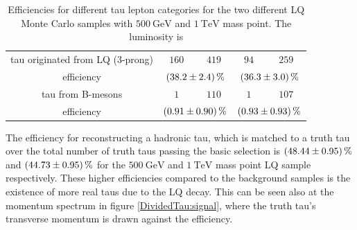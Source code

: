 \begin{table}
\begin{tabular*}{\linewidth}{@{\extracolsep{\fill}}ccccc}
		\hline
                tau originated from LQ (3-prong)& $160$        & $419$         & $94$          & $259$
		\\
		efficiency                  & \multicolumn{2}{c}{$\SI{38.2\pm 2.4}{\percent}$}   & \multicolumn{2}{c}{$\SI{36.3\pm 3.0}{\percent}$}
		\\
		\hline
		tau from B-mesons           & $1$            & $110$      & $1$            & $107$ 
		\\
		efficiency                  & \multicolumn{2}{c}{$\SI{0.91\pm 0.90}{\percent}$}   & \multicolumn{2}{c}{$\SI{0.93\pm 0.93}{\percent}$}
		\\
		\hline
		\hline
		\end{tabular*}
		\caption[Efficiencies for the two LQ samples with $\SI{500}{\giga\electronvolt}$ and $\SI{1}{\tera\electronvolt}$ mass point.]{Efficiencies for different tau lepton categories for the two different LQ Monte Carlo samples with $\SI{500}{\giga\electronvolt}$ and $\SI{1}{\tera\electronvolt}$ mass point. The luminosity is}
		\label{LQEffTable}
                \renewcommand{\arraystretch}{1}
                \end{table}
%
The efficiency for reconstructing a hadronic tau, which is matched to a truth tau over the total number of truth taus passing the basic selection is $\SI{48.44\pm 0.95}{\percent}$ and $\SI{44.73\pm 0.95}{\percent}$ for the $\SI{500}{\giga\electronvolt}$ and $\SI{1}{\tera\electronvolt}$ mass point LQ sample respectively. These higher efficiencies compared to the background samples is the existence of more real taus due to the LQ decay. This can be seen also at the momentum spectrum in figure \ref{DividedTau:signal}, where the truth tau's transverse momentum is drawn against the efficiency.\par  
